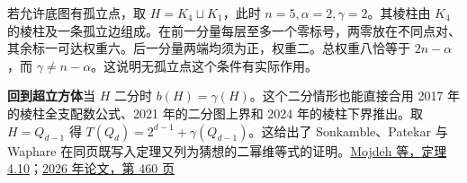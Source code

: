 \documentclass[11pt,a4paper]{article}
\newcommand{\subh}[1]{\par\textbf{#1}\quad}
\begin{document}
若允许底图有孤立点，取 $H=K_4\sqcup K_1$，此时 $n=5,\alpha=2,\gamma=2$。其棱柱由 $K_4$ 的棱柱及一条孤立边组成。在前一分量每层至多一个零标号，两零放在不同点对、其余标一可达权重六。后一分量两端均须为正，权重二。总权重八恰等于 $2n-\alpha$，而 $\gamma\ne n-\alpha$。这说明无孤立点这个条件有实际作用。

\subh{回到超立方体}当 $H$ 二分时 $b(H)=\gamma(H)$。这个二分情形也能直接合用 2017 年的棱柱全支配数公式、2021 年的二分图上界和 2024 年的棱柱下界推出。取 $H=Q_{d-1}$ 得 $T(Q_d)=2^{d-1}+\gamma(Q_{d-1})$。这给出了 Sonkamble、Patekar 与 Waphare 在同页既写入定理又列为猜想的二幂维等式的证明。\href{https://doi.org/10.1016/j.dam.2021.01.027}{Mojdeh 等，定理 4.10}；\href{https://pphmjopenaccess.com/aadm/article/download/4533/2173\#page=10}{2026 年论文，第 460 页}
\end{document}

